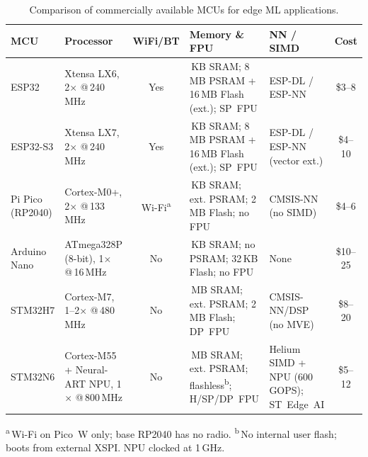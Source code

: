 \begin{table}[htbp]
    \centering
    \caption{Comparison of commercially available MCUs for edge ML applications.}
    \label{tab:mcu_comparison}
    \renewcommand{\arraystretch}{1.25}
    \footnotesize
    \setlength{\tabcolsep}{4pt}
    \begin{tabularx}{\textwidth}{@{}l >{\raggedright\arraybackslash}X c >{\raggedright\arraybackslash}X >{\raggedright\arraybackslash}X c@{}}
        \toprule
        \textbf{MCU} & \textbf{Processor} & \textbf{WiFi/BT}
            & \textbf{Memory \& FPU} & \textbf{NN / SIMD} & \textbf{Cost} \\
        \midrule
        ESP32
            & Xtensa LX6, 2$\times$ @\,240\,MHz
            & Yes
            & 520\,KB SRAM; 8\,MB PSRAM + 16\,MB Flash (ext.); SP~FPU
            & ESP-DL / ESP-NN
            & \$3--8 \\
        \addlinespace[3pt]
        ESP32-S3
            & Xtensa LX7, 2$\times$ @\,240\,MHz
            & Yes
            & 512\,KB SRAM; 8\,MB PSRAM + 16\,MB Flash (ext.); SP~FPU
            & ESP-DL / ESP-NN (vector ext.)
            & \$4--10 \\
        \addlinespace[3pt]
        Pi Pico (RP2040)
            & Cortex-M0+, 2$\times$ @\,133\,MHz
            & Wi-Fi\textsuperscript{a}
            & 264\,KB SRAM; ext. PSRAM; 2\,MB Flash; no FPU
            & CMSIS-NN (no SIMD)
            & \$4--6 \\
        \addlinespace[3pt]
        Arduino Nano
            & ATmega328P (8-bit), 1$\times$ @\,16\,MHz
            & No
            & 2\,KB SRAM; no PSRAM; 32\,KB Flash; no FPU
            & None
            & \$10--25 \\
        \addlinespace[3pt]
        STM32H7
            & Cortex-M7, 1--2$\times$ @\,480\,MHz
            & No
            & 1\,MB SRAM; ext. PSRAM; 2\,MB Flash; DP~FPU
            & CMSIS-NN/DSP (no MVE)
            & \$8--20 \\
        \addlinespace[3pt]
        STM32N6
            & Cortex-M55 + Neural-ART NPU, 1$\times$ @\,800\,MHz
            & No
            & 4.2\,MB SRAM; ext. PSRAM; flashless\textsuperscript{b}; H/SP/DP~FPU
            & Helium SIMD + NPU (600\,GOPS); ST~Edge~AI
            & \$5--12 \\
        \bottomrule
    \end{tabularx}

    \vspace{3pt}
    {\footnotesize \textsuperscript{a}\,Wi-Fi on Pico~W only; base RP2040 has no radio.\quad
    \textsuperscript{b}\,No internal user flash; boots from external XSPI. NPU clocked at 1\,GHz.}
\end{table}